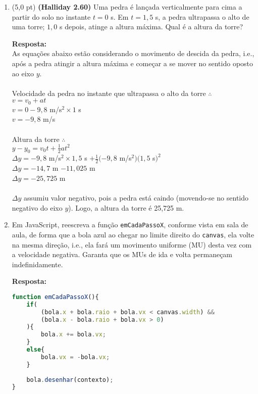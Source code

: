\documentclass[12pt,a4paper,oneside]{article}
\begin{document}
\begin{enumerate}

	\item (5,0 pt) {\bf (Halliday 2.60)} Uma pedra é lançada verticalmente para cima a partir do solo no instante $t = 0$ s. Em  $t  = 1,5$ s, a pedra ultrapassa o alto de uma torre; $1,0$ s depois, atinge a altura máxima. Qual é a altura da torre?
	
	{\color{blue} {\bf Resposta:} \\
		As equações abaixo estão considerando o movimento de descida da pedra, i.e., após a pedra atingir a altura máxima e começar a se mover no sentido oposto ao eixo $y$.\\
		\\
		Velocidade da pedra no instante que ultrapassa o alto da torre $\therefore$ \\
		$v = v_0 + at$\\
		$v = 0 -9,8$ m/s$^2 \times 1$ s\\
		$v = -9,8$ m/s\\
		\\
		Altura da torre $\therefore$\\
		$y - y_0 = v_0t + \frac{1}{2} a t^2$ \\
		$\Delta y = -9,8$ m/s$^2 \times 1,5$ s $+\frac{1}{2} (-9,8$ m/s$^2)(1,5$ s$)^2$\\
		$\Delta y = -14,7$ m $-11,025$ m\\
		$\Delta y = -25,725$ m\\
		\\
		$\Delta y$ assumiu valor negativo, pois a pedra está caindo (movendo-se no sentido negativo do eixo $y$). Logo, a altura da torre é 25,725 m. 
	}
	
	\newpage
	
	\item Em JavaScript, reescreva a função {\tt emCadaPassoX}, conforme vista em sala de aula, de forma que a bola azul ao chegar no limite direito do {\tt canvas}, ela volte na mesma direção, i.e., ela fará um movimento uniforme (MU) desta vez com a velocidade negativa. Garanta que os MUs de ida e volta permaneçam indefinidamente.
	
	{\color{blue} \bf Resposta: }
	
	\begin{lstlisting}[language=JavaScript]
function emCadaPassoX(){
	if(
		(bola.x + bola.raio + bola.vx < canvas.width) &&
		(bola.x - bola.raio + bola.vx > 0)
	){
		bola.x += bola.vx;
	}
	else{
		bola.vx = -bola.vx;
	}
	
	bola.desenhar(contexto);
}\end{lstlisting}
	
\end{enumerate}
\end{document}
